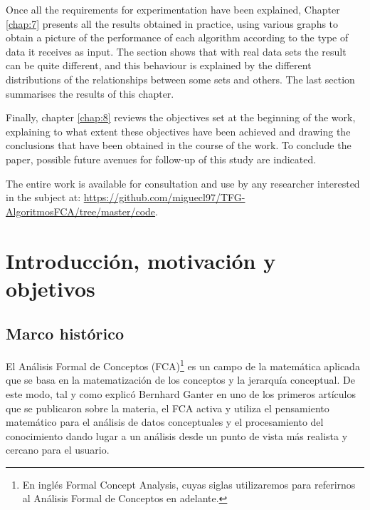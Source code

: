 \documentclass[oneside,openright,titlepage,numbers=noenddot,openany,headinclude,footinclude=true,
cleardoublepage=empty,abstractoff,BCOR=5mm,paper=a4,fontsize=12pt,main=spanish]{scrreprt}
\begin{document}
Once all the requirements for experimentation have been explained, Chapter \ref{chap:7} presents all the results obtained in practice, using various graphs to obtain a picture of the performance of each algorithm according to the type of data it receives as input. The section shows that with real data sets the result can be quite different, and this behaviour is explained by the different distributions of the relationships between some sets and others. The last section summarises the results of this chapter.


Finally, chapter \ref{chap:8} reviews the objectives set at the beginning of the work, explaining to what extent these objectives have been achieved and drawing the conclusions that have been obtained in the course of the work. To conclude the paper, possible future avenues for follow-up of this study are indicated.

The entire work is available for consultation and use by any researcher interested in the subject at: \href{https://github.com/miguecl97/TFG-AlgoritmosFCA/tree/master/code}{https://github.com/miguecl97/TFG-AlgoritmosFCA/tree/master/code}.




\newpage
\tableofcontents


\listoffigures
\listoftables

\chapter{Introducción, motivación y objetivos}
\label{chap:1}
\section{Marco histórico}
El Análisis Formal de Conceptos (FCA)\footnote{En inglés Formal Concept Analysis, cuyas siglas utilizaremos para referirnos al Análisis Formal de Conceptos en adelante.} es un campo de la matemática aplicada que se basa en la matematización de los conceptos y la jerarquía conceptual. De este modo, tal y como explicó Bernhard Ganter \cite{ganter_formal_1999} en uno de los primeros artículos que se publicaron sobre la materia, el FCA activa y utiliza el pensamiento matemático para el análisis de datos conceptuales y el procesamiento del conocimiento dando lugar a un análisis desde un punto de vista más realista y cercano para el usuario.
\end{document}
